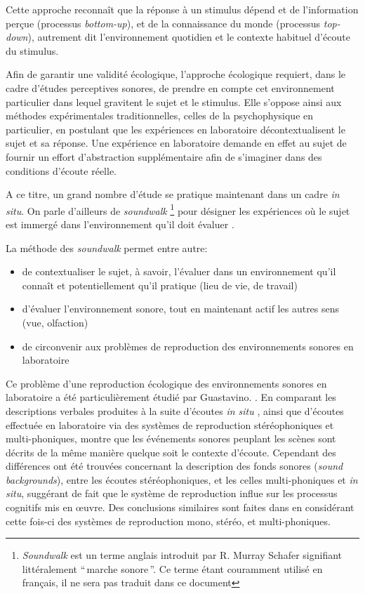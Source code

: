 Cette approche reconnaît que la réponse à un stimulus dépend et de l'information perçue (processus \emph{bottom-up}), et de la connaissance du monde (processus \emph{top-down}), autrement dit l'environnement quotidien et le contexte habituel d'écoute du stimulus.

Afin de garantir une validité écologique, l’approche écologique requiert, dans le cadre d'études perceptives sonores, de prendre en compte cet environnement particulier dans lequel gravitent le sujet et le stimulus. Elle s’oppose ainsi aux méthodes expérimentales traditionnelles, celles de la psychophysique en particulier, en postulant que les expériences en laboratoire décontextualisent le sujet et sa réponse. Une expérience en laboratoire demande en effet au sujet de fournir un effort d'abstraction supplémentaire afin de s’imaginer dans des conditions d'écoute réelle.

A ce titre, un grand nombre d'étude se pratique maintenant dans un cadre \emph{in situ}. On parle d'ailleurs de \emph{soundwalk}  \footnote{\emph{Soundwalk} est un terme anglais introduit par R. Murray Schafer \citep{schafer1969new} signifiant littéralement ``\,marche sonore\,''. Ce terme étant couramment utilisé en français, il ne sera pas traduit dans ce document} pour désigner les expériences où le sujet est immergé dans l'environnement qu'il doit évaluer \citep{adams2008soundwalking,jeon2013soundwalk}.

La méthode des \emph{soundwalk} permet entre autre:

\begin{itemize}
\item  de contextualiser le sujet, à savoir, l'évaluer dans un environnement qu'il connaît et potentiellement qu'il pratique (lieu de vie, de travail)
\item d'évaluer l'environnement sonore, tout en maintenant actif les autres sens (vue, olfaction)
\item de circonvenir aux problèmes de reproduction des environnements sonores en laboratoire
\end{itemize}

Ce problème d'une reproduction écologique des environnements sonores en laboratoire a été particulièrement étudié par Guastavino. \citep{guastavino2003approche,guastavino2004perceptual,guastavino2005ecological}. En comparant les descriptions verbales produites à la suite d'écoutes \emph{in situ} , ainsi que d'écoutes effectuée en laboratoire via des systèmes de reproduction stéréophoniques et multi-phoniques, \citep{guastavino2005ecological} montre que les événements sonores peuplant les scènes sont décrits de la même manière quelque soit le contexte d'écoute. Cependant des différences ont été trouvées concernant la description des fonds sonores (\emph{sound backgrounds}), entre les écoutes stéréophoniques, et les celles multi-phoniques et \emph{in situ}, suggérant de fait que le système de reproduction influe sur les processus cognitifs mis en œuvre. Des conclusions similaires sont faites dans \citep{guastavino2004perceptual} en considérant cette fois-ci des systèmes de reproduction mono, stéréo, et multi-phoniques.


